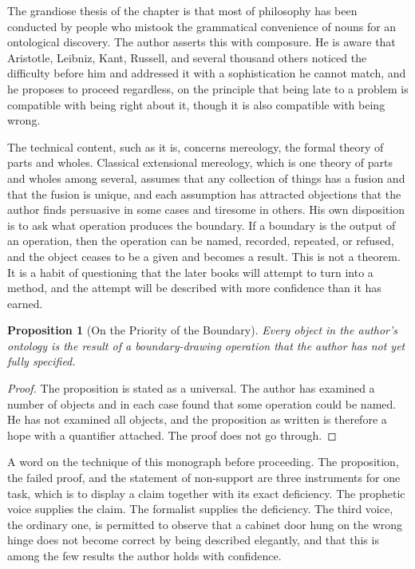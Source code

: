 \documentclass[11pt,openany,twoside]{book}
\theoremstyle{plain}
\newtheorem{proposition}{Proposition}[chapter]
\theoremstyle{definition}
\theoremstyle{remark}
\begin{document}
The grandiose thesis of the chapter is that most of philosophy has been conducted by people who mistook the grammatical convenience of nouns for an ontological discovery. The author asserts this with composure. He is aware that Aristotle, Leibniz, Kant, Russell, and several thousand others noticed the difficulty before him and addressed it with a sophistication he cannot match, and he proposes to proceed regardless, on the principle that being late to a problem is compatible with being right about it, though it is also compatible with being wrong.

The technical content, such as it is, concerns mereology, the formal theory of parts and wholes. Classical extensional mereology, which is one theory of parts and wholes among several, assumes that any collection of things has a fusion and that the fusion is unique, and each assumption has attracted objections that the author finds persuasive in some cases and tiresome in others. His own disposition is to ask what operation produces the boundary. If a boundary is the output of an operation, then the operation can be named, recorded, repeated, or refused, and the object ceases to be a given and becomes a result. This is not a theorem. It is a habit of questioning that the later books will attempt to turn into a method, and the attempt will be described with more confidence than it has earned.

\begin{proposition}[On the Priority of the Boundary]\label{prop:boundary}
Every object in the author's ontology is the result of a boundary-drawing operation that the author has not yet fully specified.
\end{proposition}

\begin{proof}
The proposition is stated as a universal. The author has examined a number of objects and in each case found that some operation could be named. He has not examined all objects, and the proposition as written is therefore a hope with a quantifier attached. The proof does not go through.
\end{proof}

A word on the technique of this monograph before proceeding. The proposition, the failed proof, and the statement of non-support are three instruments for one task, which is to display a claim together with its exact deficiency. The prophetic voice supplies the claim. The formalist supplies the deficiency. The third voice, the ordinary one, is permitted to observe that a cabinet door hung on the wrong hinge does not become correct by being described elegantly, and that this is among the few results the author holds with confidence.
\end{document}
